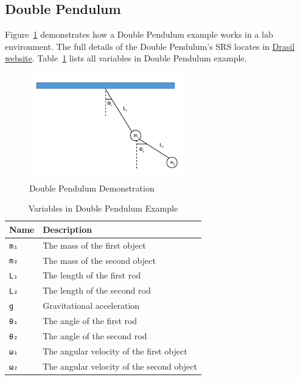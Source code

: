\subsection{Double Pendulum}
\label{se_dblpen}
Figure~\ref{fig_dblpen} demonstrates how a Double Pendulum example works in a lab environment. The full details of the Double Pendulum's SRS locates in \href{https://jacquescarette.github.io/Drasil/examples/dblpendulum/SRS/srs/DblPendulum_SRS.html}{Drasil website}. Table~\ref{tab_dblpendes} lists all variables in Double Pendulum example.
\begin{figure}[ht]
  \centering
  \includegraphics[width=0.6\textwidth]{figures/DblPendulum.png}
  \caption{Double Pendulum Demonstration}
  \label{fig_dblpen}
\end{figure}

\begin{table}[ht]
	\begin{tabular}{ p{} p{} }
		\textbf{Name} & \textbf{Description} \\
		\toprule
		\verb|m₁| & The mass of the first object\\
    \verb|m₂| & The mass of the second object\\
		\verb|L₁| & The length of the first rod\\
		\verb|L₂| & The length of the second rod\\
		\verb|g| & Gravitational acceleration\\
		\verb|θ₁| & The angle of the first rod\\
		\verb|θ₂| & The angle of the second rod\\
		\verb|ω₁| & The angular velocity of the first object\\
		\verb|ω₂| & The angular velocity of the second object\\
		\bottomrule	
	\end{tabular}	
	\caption{Variables in Double Pendulum Example}	
	\label{tab_dblpendes}
\end{table}

